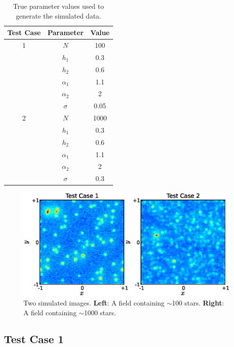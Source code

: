 \documentclass[manuscript]{aastex}
\begin{document}
\begin{table}\footnotesize
\begin{center}
\begin{tabular}{|c|c|c|}
\hline
Test Case & Parameter & Value \\
\hline
1 & $N$ & 100\\
  & $h_1$ & 0.3\\
  & $h_2$ & 0.6\\
  & $\alpha_1$ & 1.1\\
  & $\alpha_2$ & 2\\
  & $\sigma$ & 0.05\\
\hline
2 & $N$ & 1000\\
  & $h_1$ & 0.3\\
  & $h_2$ & 0.6\\
  & $\alpha_1$ & 1.1\\
  & $\alpha_2$ & 2\\
  & $\sigma$ & 0.3\\
\hline
\end{tabular}
\end{center}
\caption{True parameter values used to generate the simulated data.
\label{tab:truth}}
\end{table}

\begin{figure}
\begin{center}
\includegraphics[scale=0.7]{Figures/test_cases.eps}
\caption{Two simulated images.
{\bf Left}: A field containing $\sim$100 stars.
{\bf Right}: A field containing $\sim$1000 stars.\label{fig:simulated_data}}
\end{center}
\end{figure}

\subsection{Test Case 1}
\end{document}
